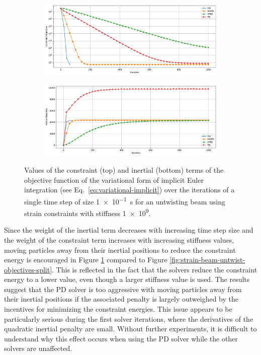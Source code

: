 \begin{figure}[h]
    \centering
    \begin{subfigure}{\textwidth}
        \includegraphics[width=\linewidth]{figures/strain_beam_untwist_constraintObjectives_large_ts.pdf}
    \end{subfigure}
    \begin{subfigure}{\textwidth}
        \includegraphics[width=\linewidth]{figures/strain_beam_untwist_inertialObjectives_large_ts.pdf}
    \end{subfigure}
    \caption{Values of the constraint (top) and inertial (bottom) terms of the objective function of the variational form of implicit Euler integration 
        (see Eq.\ \ref{eq:variational-implicit}) over the iterations of a single time step of size \SI{1e-1}{\second} for an untwisting beam using strain constraints with 
    stiffness \num{1e9}.}
    \label{fig:strain-beam-untwist-objectives-split-large-ts}
\end{figure}

Since the weight of the inertial term decreases with increasing time step size and the weight of the constraint term increases with increasing stiffness values, moving 
particles away from their inertial positions to reduce the constraint energy is encouraged in Figure \ref{fig:strain-beam-untwist-objectives-split-large-ts} compared to
Figure \ref{fig:strain-beam-untwist-objectives-split}. This is reflected in the fact that the solvers reduce the constraint energy to a lower value, even though a larger 
stiffness value is used. The results suggest that the PD solver is too aggressive with moving particles away from their inertial positions if the associated penalty 
is largely outweighed by the incentives for minimizing the constraint energies. This issue 
appears to be particularly serious during the first solver iterations, where the derivatives of the quadratic inertial penalty are small. 
Without further experiments, it is difficult to understand why this effect occurs when using the PD solver while the other solvers are unaffected.

